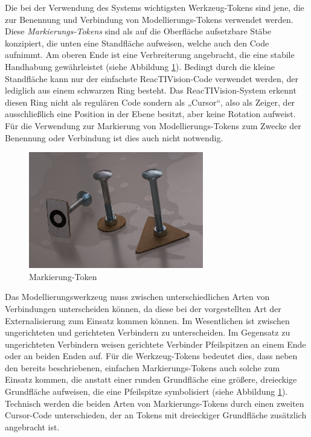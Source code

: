 Die bei der Verwendung des Systems wichtigsten Werkzeug-Tokens sind jene, die zur Benennung und Verbindung von Modellierungs-Tokens verwendet werden. Diese \emph{Markierungs-Tokens} sind als auf die Oberfläche aufsetzbare Stäbe konzipiert, die unten eine Standfläche aufweisen, welche auch den Code aufnimmt. Am oberen Ende ist eine Verbreiterung angebracht, die eine stabile Handhabung gewährleistet (siehe Abbildung \ref{fig:img_SystemNeu_Markierungstoken_alle}). Bedingt durch die kleine Standfläche kann nur der einfachste ReacTIVision-Code verwendet werden, der lediglich aus einem schwarzen Ring besteht. Das ReacTIVision-System erkennt diesen Ring nicht als regulären Code sondern als „Cursor“, also als Zeiger, der ausschließlich eine Position in der Ebene besitzt, aber keine Rotation aufweist. Für die Verwendung zur Markierung von Modellierungs-Tokens zum Zwecke der Benennung oder Verbindung ist dies auch nicht notwendig.

\begin{figure}[htbp]
	\centering
		\includegraphics[height=2in]{img/SystemNeu/Markierungstoken_alle.jpg}
	\caption{Markierung-Token}
	\label{fig:img_SystemNeu_Markierungstoken_alle}
\end{figure}


Das Modellierungswerkzeug muss zwischen unterschiedlichen Arten von Verbindungen unterscheiden können, da diese bei der vorgestellten Art der Externalisierung zum Einsatz kommen können. Im Wesentlichen ist zwischen ungerichteten und gerichteten Verbindern zu unterscheiden. Im Gegensatz zu ungerichteten Verbindern weisen gerichtete Verbinder Pfeilspitzen an einem Ende oder an beiden Enden auf. Für die Werkzeug-Tokens bedeutet dies, dass neben den bereits beschriebenen, einfachen Markierungs-Tokens auch solche zum Einsatz kommen, die anstatt einer runden Grundfläche eine größere, dreieckige Grundfläche aufweisen, die eine Pfeilspitze symbolisiert (siehe Abbildung \ref{fig:img_SystemNeu_Markierungstoken_alle}). Technisch werden die beiden Arten von Markierungs-Tokens durch einen zweiten Cursor-Code unterschieden, der an Tokens mit dreieckiger Grundfläche zusätzlich angebracht ist.

